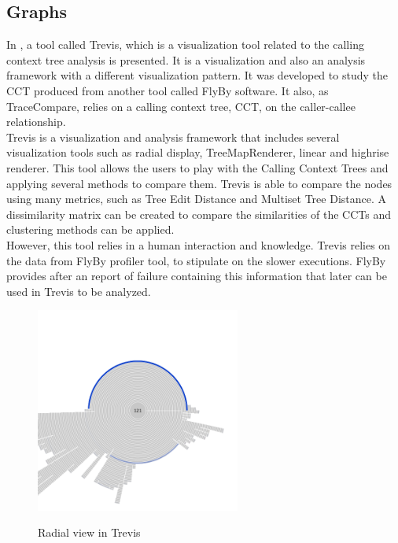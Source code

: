 \subsection{Graphs}
In \cite{trevis}, a tool called Trevis, which is a visualization tool related to the calling context tree analysis is presented. It is a visualization and also an analysis framework with a different visualization pattern. It was developed to study the CCT produced from another tool called FlyBy software. It also, as TraceCompare, relies on a calling context tree, CCT, on the caller-callee relationship.\\

Trevis is a visualization and analysis framework that includes several visualization tools such as radial display, TreeMapRenderer, linear  and highrise renderer.
This tool allows the users to play with the Calling Context Trees and applying several methods to compare them. Trevis is able to compare the nodes using many metrics, such as Tree Edit Distance and Multiset Tree Distance. A dissimilarity matrix can be created to compare the similarities of the CCTs and clustering methods can be applied.\\
However, this tool relies in a human interaction and knowledge. Trevis relies on the data from FlyBy profiler tool, to stipulate on the slower executions. FlyBy provides after an report of failure containing this information that later can be used in Trevis to be analyzed.

\begin{figure}[h]
          \center
          \caption{Radial view in Trevis}
            \includegraphics[width=0.60\textwidth]{figures/ring-600-color.png}
            \label{fig:RadialView}
\end{figure}
    
